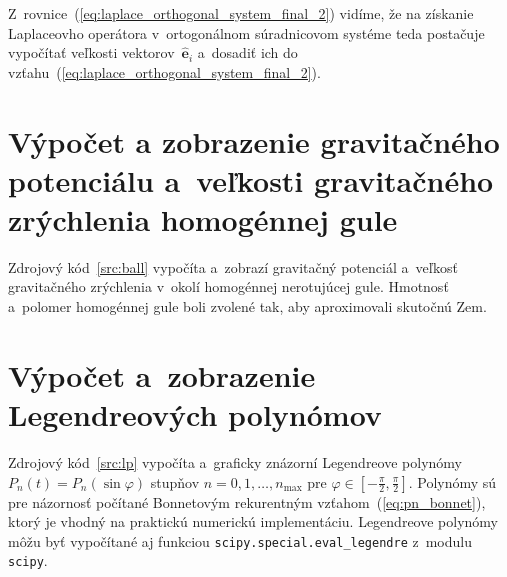 \documentclass[a4paper, 12pt]{book}
\let\vec\mathbf
\begin{document}
Z~rovnice~(\ref{eq:laplace_orthogonal_system_final_2}) vidíme, že na získanie 
Laplaceovho operátora v~ortogonálnom súradnicovom systéme teda postačuje 
vypočítať veľkosti vektorov~$\hat{\vec e}_i$ a~dosadiť ich do 
vzťahu~(\ref{eq:laplace_orthogonal_system_final_2}).




\chapter{Výpočet a zobrazenie gravitačného potenciálu a~veľkosti gravitačného 
zrýchlenia homogénnej gule}
\label{app:ball}

Zdrojový kód~\ref{src:ball} vypočíta a~zobrazí gravitačný potenciál a~veľkosť 
gravitačného zrýchlenia v~okolí homogénnej nerotujúcej gule.  Hmotnosť 
a~polomer homogénnej gule boli zvolené tak, aby aproximovali skutočnú Zem.

\vspace{4ex}






\chapter{Výpočet a~zobrazenie Legendreových polynómov}
\label{app:lp}

Zdrojový kód~\ref{src:lp} vypočíta a~graficky znázorní Legendreove polynómy 
$P_n(t) = P_n(\sin\varphi)$ stupňov $n = 0, 1, \dots, n_{\max}$ pre $\varphi 
\in [-\frac{\pi}{2}, \frac{\pi}{2}]$.  Polynómy sú pre názornosť počítané 
Bonnetovým rekurentným vzťahom~(\ref{eq:pn_bonnet}), ktorý je vhodný na 
praktickú numerickú implementáciu.  Legendreove polynómy môžu byť vypočítané aj 
funkciou \texttt{scipy.special.eval\_legendre} z~modulu \texttt{scipy}.

\vspace{4ex}


\end{document}
